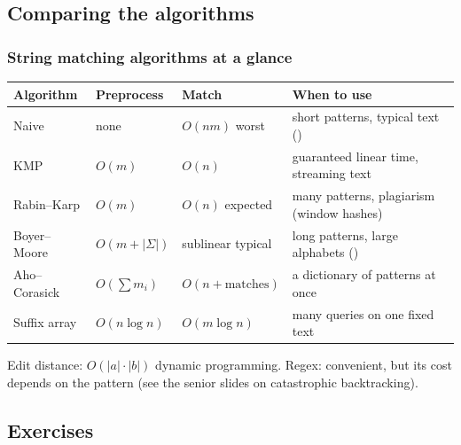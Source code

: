 \documentclass[aspectratio=169,10pt,compress]{beamer}
\begin{document}

\subsection[Compare]{Comparing the algorithms}




\begin{frame}[t,fragile] \frametitle{String matching algorithms at a glance}
  \small
  
  \begin{tabular}{@{}L{0.2\textwidth}L{0.14\textwidth}L{0.17\textwidth}L{0.4\textwidth}@{}}
    \toprule
    \textbf{Algorithm} & \textbf{Preprocess} & \textbf{Match} & \textbf{When to use} \\
    \midrule
    Naive            & none     & $O(nm)$ worst      & short patterns, typical text () \\
    KMP              & $O(m)$   & $O(n)$             & guaranteed linear time, streaming text \\
    Rabin--Karp      & $O(m)$   & $O(n)$ expected    & many patterns, plagiarism (window hashes) \\
    Boyer--Moore     & $O(m + |\Sigma|)$ & sublinear typical & long patterns, large alphabets () \\
    Aho--Corasick    & $O(\sum m_{i})$ & $O(n + \text{matches})$ & a dictionary of patterns at once \\
    Suffix array     & $O(n \log n)$ & $O(m \log n)$ & many queries on one fixed text \\
    \bottomrule
  \end{tabular}

  \vspace{0.5em}
  Edit distance: $O(|a| \cdot |b|)$ dynamic programming. 
  Regex: convenient, but its cost depends on the pattern
  (see the senior slides on catastrophic backtracking).
\end{frame}

\subsection[Exercises]{Exercises}
\end{document}
